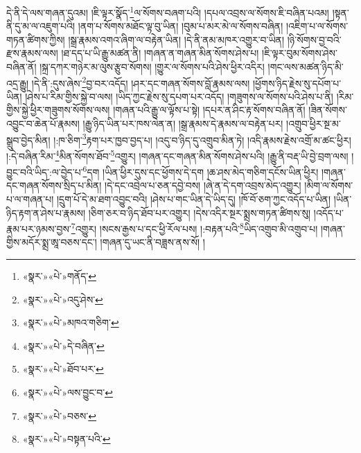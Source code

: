 དེ་ནི་དེ་ལས་གཞན་དུའམ། །ཇི་ལྟར་སྣོད་\footnote{«སྣར་»«པེ་»གནོད་}ལ་སོགས་བཞག་པའི། །དཔལ་འབྲས་ལ་སོགས་ཇི་བཞིན་པའམ། །སྟན་ནི་དུ་མ་ལ་འཇུག་པའི། །ནག་པ་སོགས་མཐོང་ལྟ་བུ་ཡིན། །བུམ་པ་མར་མེ་ལ་སོགས་བཞིན། །འཇིག་པ་ལ་སོགས་གཏན་ཚིགས་ཀྱིས། །སྒྲ་རྣམས་འགའ་ཞིག་ལ་བརྟེན་ཡིན། །དེ་ནི་ནམ་མཁར་འགྱུར་བ་ཡིན། །ཉི་སོགས་བྱ་བའི་རྫས་རྣམས་ལས། །ཐ་དད་པ་ཡི་རྒྱུ་མཚན་ནི། །གཞན་ན་གཞན་མིན་སོགས་ཤེས་པ། །ཇི་ལྟར་བུམ་སོགས་ཤེས་བཞིན་ནོ། །སྐྲ་དཀར་གཉེར་མ་ལུས་རྩུབ་སོགས། །གྱུར་ལ་སོགས་པའི་ཤེས་ཕྱིར་འདིར། །གང་ལས་མཚན་ཉིད་མི་འདྲ་རྒྱུ། །དེ་ནི་:དུས་ཞེས་\footnote{«སྣར་»«པེ་»འདུ་ཤེས་}བྱ་བར་འདོད། །ཤར་དང་གཞན་སོགས་བློ་རྣམས་ལས། །ཕྱོགས་ཉིད་རྗེས་སུ་དཔོག་པ་ཡིན། །ཤེས་པ་རིམ་གྱིས་སྐྱེ་བ་ལས། །ཡིད་ཀྱང་རྗེས་སུ་དཔག་པར་འདོད། །གཟུགས་ལ་སོགས་པའི་ཤེས་པ་ནི། །རིམ་གྱིས་སྐྱེ་ཕྱིར་གཟུགས་སོགས་ལས། །གཞན་པའི་རྒྱུ་ལ་ལྟོས་པ་སྟེ། །དཔར་ན་ཤིང་རྟ་སོགས་བཞིན་ནོ། །ཟིན་སོགས་འབྱུང་བ་ཆེན་པོ་རྣམས། །རྒྱུ་ཉིད་ཡིན་པར་ཁས་ལེན་ན། །སྒྲ་རྣམས་དེ་རྣམས་ལ་བརྟེན་པར། །འགྲུབ་ཕྱིར་སྔ་མ་སྒྲུབ་བྱེད་མིན། །:ཁ་ཅིག་\footnote{«སྣར་»«པེ་»མཁའ་གཅིག་}རྟག་པར་ཁྱབ་བྱད་པ། །འདུ་བ་ཉིད་དུ་འགྲུབ་མིན་ཏེ། །འདི་རྣམས་རྗེས་འགྲོ་མ་ཚང་ཕྱིར། །:དེ་བཞིན་རིམ་\footnote{«སྣར་»«པེ་»དེ་བཞིན་}མིན་སོགས་ཐོབ་\footnote{«སྣར་»«པེ་»ཐོབ་པར་}འགྱུར། །གཞན་དང་གཞན་མིན་སོགས་ཤེས་པའི། །རྒྱུ་ནི་བརྡ་ཡི་བྱེ་བྲག་ལས། །བྱུང་བའི་ཡིད་:ལ་བྱེད་པ་\footnote{«སྣར་»«པེ་»ལས་བྱུང་བ་}དག །ཡིན་ཕྱིར་དུས་དང་ཕྱོགས་དེ་དག །ཆ་ཤས་མེད་གཅིག་དངོས་ཡིན་ཕྱིར། །གཞན་དང་གཞན་སོགས་སྲིད་པ་མིན། །དེ་དང་འབྲེལ་པ་ཅན་དབྱེ་བས། །ཞེ་ན་དེ་དག་འབྲས་མེད་འགྱུར། །མིག་ལ་སོགས་པ་ལ་གཞན་པ། །དྲུག་པོ་དེ་མ་ཐག་འབྱུང་བའི། །ཤེས་པ་གང་ཡིན་དེ་ཡིད་དུ། །ཁོ་བོ་ཅག་ཀྱང་འདོད་པ་ཡིན། །ཡིན་ཉིད་རྟག་ན་ཤེས་པ་རྣམས། །ཅིག་ཅར་བ་ཉིད་ཐོབ་པར་འགྱུར། །དེས་འདིར་སྔར་སྨྲས་གཏན་ཚིགས་སུ། །འདོད་པ་རྣམ་པར་ཉམས་བྱས་\footnote{«སྣར་»«པེ་»བཅས་}འགྱུར། །སངས་རྒྱས་པ་དང་ཕྱི་རོལ་པས། །:བརྟན་པའི་\footnote{«སྣར་»«པེ་»བསྟན་པའི་}ཡིད་འགྲུབ་མི་འགྲུབ་པ། །གཞན་གྱིས་མདོར་སྨྲ་ཨཱ་བཅས་དང་། །གཞན་དུ་ཡང་ནི་བཟླས་ནས་སོ། །
